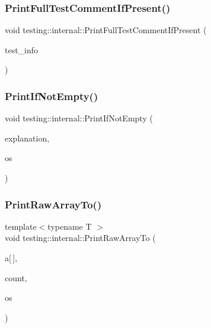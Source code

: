 \mbox{\label{namespacetesting_1_1internal_a7a85ebe3b4de93a1edb091f92f1fb393}} 
\subsubsection{\texorpdfstring{Print\+Full\+Test\+Comment\+If\+Present()}{PrintFullTestCommentIfPresent()}}
{\footnotesize\ttfamily void testing\+::internal\+::\+Print\+Full\+Test\+Comment\+If\+Present (\begin{DoxyParamCaption}\item[{const \hyperlink{classtesting_1_1_test_info}{Test\+Info} \&}]{test\+\_\+info }\end{DoxyParamCaption})}

\mbox{\label{namespacetesting_1_1internal_afa4cd5d7933878d6d820b32c87bb2767}} 
\subsubsection{\texorpdfstring{Print\+If\+Not\+Empty()}{PrintIfNotEmpty()}}
{\footnotesize\ttfamily void testing\+::internal\+::\+Print\+If\+Not\+Empty (\begin{DoxyParamCaption}\item[{const \hyperlink{namespacetesting_1_1internal_a8e8ff5b11e64078831112677156cb111}{internal\+::string} \&}]{explanation,  }\item[{\+::std\+::ostream $\ast$}]{os }\end{DoxyParamCaption})\hspace{0.3cm}{\ttfamily [inline]}}

\mbox{\label{namespacetesting_1_1internal_ad3013b6b4c825edee9fe18ff1d982faa}} 
\subsubsection{\texorpdfstring{Print\+Raw\+Array\+To()}{PrintRawArrayTo()}}
{\footnotesize\ttfamily template$<$typename T $>$ \\
void testing\+::internal\+::\+Print\+Raw\+Array\+To (\begin{DoxyParamCaption}\item[{const T}]{a\mbox{[}$\,$\mbox{]},  }\item[{size\+\_\+t}]{count,  }\item[{\+::std\+::ostream $\ast$}]{os }\end{DoxyParamCaption})}

